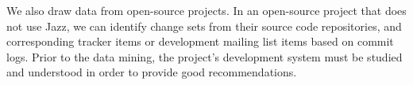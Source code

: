 We also draw data from open-source projects. In an open-source project that does not use Jazz, we can identify change sets from their source code repositories, and corresponding tracker items or development mailing list items based on commit logs. Prior to the data mining, the project's development system must be studied and understood in order to provide good recommendations.



